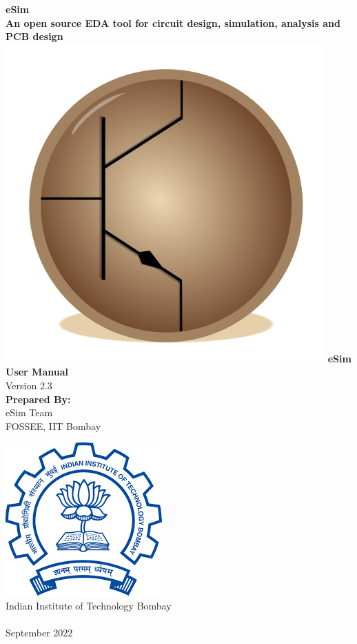 \begin{center}
{\bf {\Huge eSim} \\ [0.1in]
\LARGE An open source EDA tool for circuit design,
  simulation, analysis and PCB design} \\
\vfill
\includegraphics[width=0.3\linewidth]{logo-trimmed.png}
\vfill
\LARGE \textbf{eSim User Manual} \\ 
\small{Version 2.3}\\
\vspace{1cm}
\textbf{Prepared By:}\\
eSim Team\\
FOSSEE, IIT Bombay

\vspace{1cm}
\includegraphics[width=0.2\linewidth]{iitblogo.png} \\
Indian Institute of Technology Bombay \\ [2mm]
{\LARGE \byncnd} \\ [1mm]
September 2022
\end{center}



\cleardoublepage
